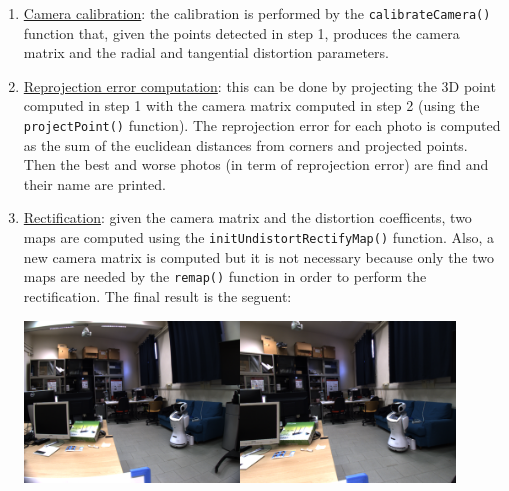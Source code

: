 \documentclass[11pt, a4paper]{toptesi}
\begin{document}
\begin{enumerate}
    \item \underline{Camera calibration}: the calibration is performed by the
        \texttt{calibrateCamera()} function that, given the points
        detected in step 1, produces the camera
        matrix and the radial and tangential distortion parameters.

    \item \underline{Reprojection error computation}: this can be done by
        projecting the 3D point computed in step 1 with the camera matrix
        computed in step 2 (using the \texttt{projectPoint()}
        function). The reprojection error for each photo is computed as the sum
        of the euclidean distances from corners and projected points. Then the
        best and worse photos (in term of reprojection error) are find and
        their name are printed.

    \item \underline{Rectification}: given the camera matrix and the distortion
        coefficents, two maps are computed using the
        \texttt{initUndistortRectifyMap()} function. Also, a new camera
        matrix is computed but it is not necessary because only the two maps are
        needed by the \texttt{remap()} function in order to perform the
        rectification. The final result is the seguent:
        
        \begin{center}
            \includegraphics[width=0.9\textwidth]{./rectification.png}
        \end{center}
\end{enumerate}
\end{document}

